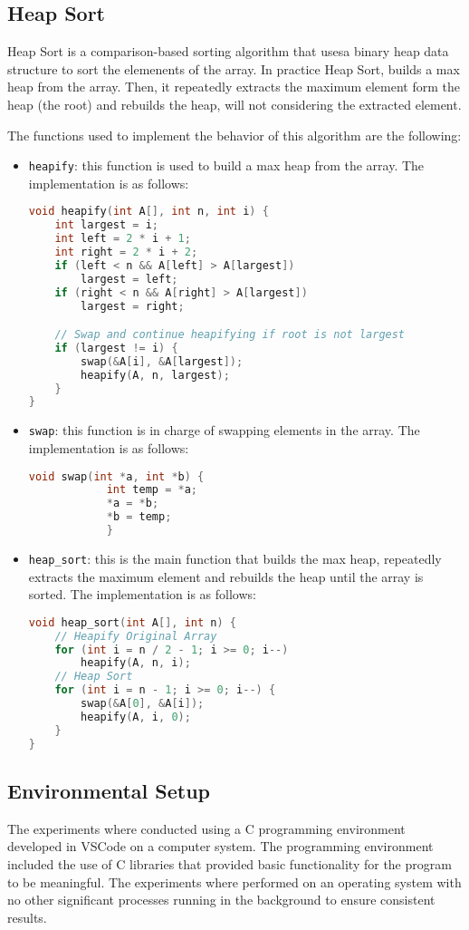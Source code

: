 \documentclass[conference]{IEEEtran}
\begin{document}
\subsection{Heap Sort}
Heap Sort is a comparison-based sorting algorithm that usesa binary heap data structure to sort the elemenents of the array. In practice Heap Sort, builds a max heap from the array. Then, it repeatedly extracts the maximum element form the heap (the root) and rebuilds the heap, will not considering the extracted element.

The functions used to implement the behavior of this algorithm are the following:
\begin{itemize}
    \item \texttt{heapify}: this function is used to build a max heap from the array. The implementation is as follows:
    \begin{lstlisting}[language=C]
void heapify(int A[], int n, int i) {
    int largest = i;
    int left = 2 * i + 1;
    int right = 2 * i + 2;
    if (left < n && A[left] > A[largest])
        largest = left;
    if (right < n && A[right] > A[largest])
        largest = right;

    // Swap and continue heapifying if root is not largest
    if (largest != i) {
        swap(&A[i], &A[largest]);
        heapify(A, n, largest);
    }
}   
    \end{lstlisting}
    \item \texttt{swap}: this function is in charge of swapping elements in the array. The implementation is as follows:
    \begin{lstlisting}[language=C]
        void swap(int *a, int *b) {
            int temp = *a;
            *a = *b;
            *b = temp;
            }       
    \end{lstlisting}
    \item \texttt{heap\_sort}: this is the main function that builds the max heap, repeatedly extracts the maximum element and rebuilds the heap until the array is sorted. The implementation is as follows:
    \begin{lstlisting}[language=C]
void heap_sort(int A[], int n) {
    // Heapify Original Array
    for (int i = n / 2 - 1; i >= 0; i--)
        heapify(A, n, i);
    // Heap Sort
    for (int i = n - 1; i >= 0; i--) {
        swap(&A[0], &A[i]);
        heapify(A, i, 0);
    }
}    
    \end{lstlisting}
\end{itemize}

\subsection{Environmental Setup}
The experiments where conducted using a C programming environment developed in VSCode on a computer system. The programming environment included the use of C libraries that provided basic functionality for the program to be meaningful. The experiments where performed on an operating system with no other significant processes running in the background to ensure consistent results.
\end{document}
